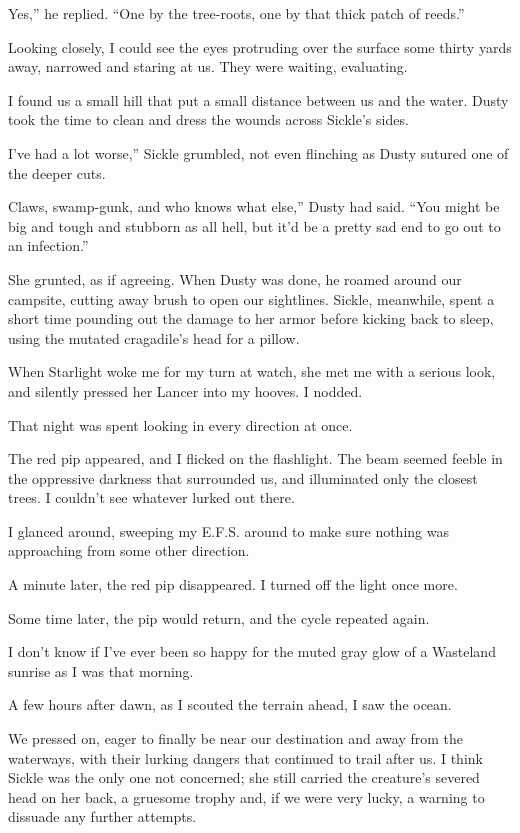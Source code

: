 \leavevmode{}Yes,” he replied. “One by the tree-roots, one by that thick patch of reeds.”

Looking closely, I could see the eyes protruding over the surface some thirty yards away, narrowed and staring at us. They were waiting, evaluating.

I found us a small hill that put a small distance between us and the water. Dusty took the time to clean and dress the wounds across Sickle’s sides.

\leavevmode{}I’ve had a lot worse,” Sickle grumbled, not even flinching as Dusty sutured one of the deeper cuts.

\leavevmode{}Claws, swamp-gunk, and who knows what else,” Dusty had said. “You might be big and tough and stubborn as all hell, but it’d be a pretty sad end to go out to an infection.”

She grunted, as if agreeing. When Dusty was done, he roamed around our campsite, cutting away brush to open our sightlines. Sickle, meanwhile, spent a short time pounding out the damage to her armor before kicking back to sleep, using the mutated cragadile’s head for a pillow.

When Starlight woke me for my turn at watch, she met me with a serious look, and silently pressed her Lancer into my hooves. I nodded.

That night was spent looking in every direction at once.

The red pip appeared, and I flicked on the flashlight. The beam seemed feeble in the oppressive darkness that surrounded us, and illuminated only the closest trees. I couldn’t see whatever lurked out there.

I glanced around, sweeping my E.F.S. around to make sure nothing was approaching from some other direction.

A minute later, the red pip disappeared. I turned off the light once more.

Some time later, the pip would return, and the cycle repeated again.

I don’t know if I’ve ever been so happy for the muted gray glow of a Wasteland sunrise as I was that morning.

{\br}%
A few hours after dawn, as I scouted the terrain ahead, I saw the ocean.

We pressed on, eager to finally be near our destination and away from the waterways, with their lurking dangers that continued to trail after us. I think Sickle was the only one not concerned; she still carried the creature’s severed head on her back, a gruesome trophy and, if we were very lucky, a warning to dissuade any further attempts.

